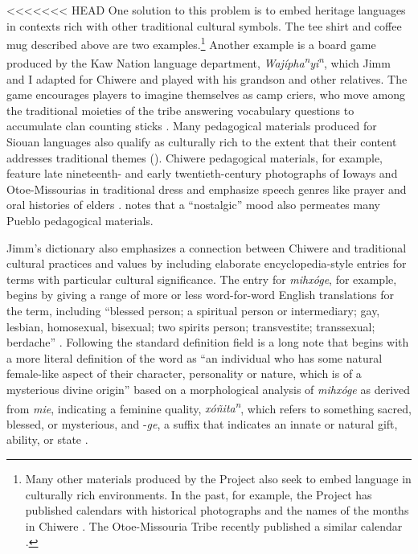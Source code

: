 \documentclass[output=paper]{LSP/langsci}
\begin{document}
<<<<<<< HEAD
One solution to this problem is to embed heritage languages in contexts rich with other traditional cultural symbols. The tee shirt and coffee mug described above are two examples.\footnote{Many other materials produced by the Project also seek to embed language in culturally rich environments. In the past, for example, the Project has published calendars with historical photographs and the names of the months in Chiwere \citep{Goodtracks1985}. The Otoe-Missouria Tribe recently published a similar calendar \citep{OtoeMissouriaLD2014}.}  Another example is a board game produced by the Kaw Nation language department, \emph{Wajípha\textsuperscript{n}yi\textsuperscript{n}}, which Jimm and I adapted for Chiwere and played with his grandson and other relatives. The game encourages players to imagine themselves as camp criers, who move among the traditional moieties of the tribe answering vocabulary questions to accumulate clan counting sticks \citep{KanzaLP2004}. Many pedagogical materials produced for Siouan languages also qualify as culturally rich to the extent that their content addresses traditional themes (\citealt[e.g.][]{HartmannMarschke2010, KanzaLP2010}). Chiwere pedagogical materials, for example, feature late nineteenth- and early twentieth-century photographs of Ioways and Otoe-Missourias in traditional dress and emphasize speech genres like prayer and oral histories of elders \citep{OtoeIowaWistrandRobinson1977, OtoeIowaWistrandRobinson1978}.  notes that a ``nostalgic'' mood also permeates many Pueblo pedagogical materials.

Jimm's dictionary also emphasizes a connection between Chiwere and traditional cultural practices and values by including elaborate encyclopedia-style entries for terms with particular cultural significance. The entry for \emph{mihxóge}, for example, begins by giving a range of more or less word-for-word English translations for the term, including ``blessed person; a spiritual person or intermediary; gay, lesbian, homosexual, bisexual; two spirits person; transvestite; transsexual; berdache'' \citep[6]{Goodtracks2008}. Following the standard definition field is a long note that begins with a more literal definition of the word as ``an individual who has some natural female-like aspect of their character, personality or nature, which is of a mysterious divine origin'' based on a morphological analysis of \emph{mihxóge} as derived from \emph{mie}, indicating a feminine quality, \emph{xóñita\textsuperscript{n}}, which refers to something sacred, blessed, or mysterious, and -\emph{ge}, a suffix that indicates an innate or natural gift, ability, or state \citep[6]{Goodtracks2008}.
\end{document}
